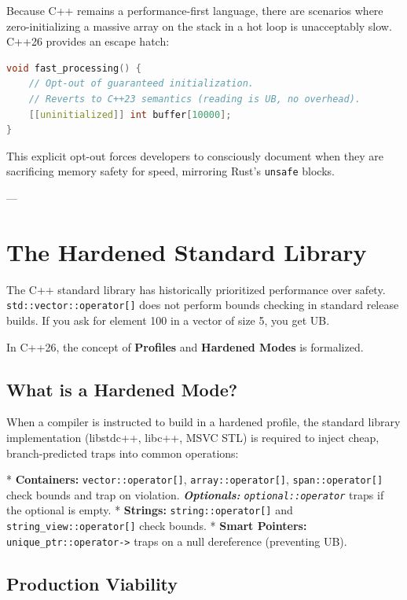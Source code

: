 {{Because C++ remains a performance-first language, there are scenarios where zero-initializing a massive array on the stack in a hot loop is unacceptably slow. C++26 provides an escape hatch:

\begin{lstlisting}[language=C++]
void fast_processing() {
    // Opt-out of guaranteed initialization. 
    // Reverts to C++23 semantics (reading is UB, no overhead).
    [[uninitialized]] int buffer[10000]; 
}
\end{lstlisting}

This explicit opt-out forces developers to consciously document when they are sacrificing memory safety for speed, mirroring Rust's \texttt{unsafe} blocks.

---

\section{The Hardened Standard Library}

The C++ standard library has historically prioritized performance over safety. \texttt{std::vector::operator[]} does not perform bounds checking in standard release builds. If you ask for element 100 in a vector of size 5, you get UB.

In C++26, the concept of \textbf{Profiles} and \textbf{Hardened Modes} is formalized.

\subsection{What is a Hardened Mode?}

When a compiler is instructed to build in a hardened profile, the standard library implementation (libstdc++, libc++, MSVC STL) is required to inject cheap, branch-predicted traps into common operations:

*   \textbf{Containers:} \texttt{vector::operator[]}, \texttt{array::operator[]}, \texttt{span::operator[]} check bounds and trap on violation.
\textit{   \textbf{Optionals:} \texttt{optional::operator}} traps if the optional is empty.
*   \textbf{Strings:} \texttt{string::operator[]} and \texttt{string_view::operator[]} check bounds.
*   \textbf{Smart Pointers:} \texttt{unique_ptr::operator->} traps on a null dereference (preventing UB).

\subsection{Production Viability}

}}
